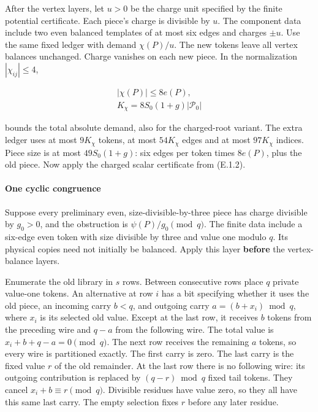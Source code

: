 \documentclass[english,11pt,a4paper]{article}
\begin{document}
After the vertex layers, let \(u>0\) be the charge unit specified by the finite potential certificate. Each piece's charge is divisible by \(u\). The component data include two even balanced templates of at most six edges and charges \(\pm u\). Use the same fixed ledger with demand \(\chi(P)/u\). The new tokens leave all vertex balances unchanged. Charge vanishes on each new piece. In the normalization \(|\chi_{ij}|\le4\),

\[\begin{gathered}
|\chi(P)|\le8e(P),\\
K_\chi=8S_0(1+g)|\mathcal P_0|
\end{gathered}
\tag{E.5.1}\]

bounds the total absolute demand, also for the charged-root variant. The extra ledger uses at most \(9K_\chi\) tokens, at most \(54K_\chi\) edges and at most \(97K_\chi\) indices. Piece size is at most \(49S_0(1+g)\): six edges per token times \(8e(P)\), plus the old piece. Now apply the charged scalar certificate from (E.1.2).

\paragraph{One cyclic congruence}\label{one-cyclic-congruence}

Suppose every preliminary even, size-divisible-by-three piece has charge divisible by \(g_0>0\), and the obstruction is \(\psi(P)/g_0\pmod q\). The finite data include a six-edge even token with size divisible by three and value one modulo \(q\). Its physical copies need not initially be balanced. Apply this layer \textbf{before} the vertex-balance layers.

Enumerate the old library in \(s\) rows. Between consecutive rows place \(q\) private value-one tokens. An alternative at row \(i\) has a bit specifying whether it uses the old piece, an incoming carry \(b<q\), and outgoing carry \(a=(b+x_i)\bmod q\), where \(x_i\) is its selected old value. Except at the last row, it receives \(b\) tokens from the preceding wire and \(q-a\) from the following wire. The total value is \(x_i+b+q-a=0\pmod q\). The next row receives the remaining \(a\) tokens, so every wire is partitioned exactly. The first carry is zero. The last carry is the fixed value \(r\) of the old remainder. At the last row there is no following wire: its outgoing contribution is replaced by \((q-r)\bmod q\) fixed tail tokens. They cancel \(x_i+b\equiv r\pmod q\). Divisible residues have value zero, so they all have this same last carry. The empty selection fixes \(r\) before any later residue.
\end{document}
